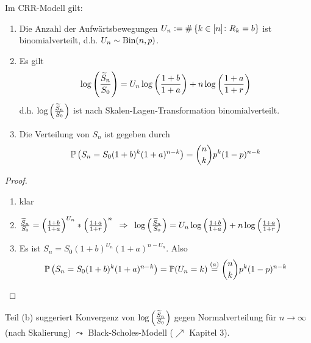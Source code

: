 \begin{proposition} %
	Im CRR-Modell gilt:
	\begin{enumerate}[label=(\alph*)]
		\item Die Anzahl der Aufwärtsbewegungen $U_n \mathrel{:=} \# \left\{ k \in [n] \colon R_k = b \right\}$ ist binomialverteilt, d.h. $U_n \sim \operatorname{Bin}(n,p)$.
		\item Es gilt 
		\begin{equation*}
			\log\left( \frac{\widetilde{S}_n}{S_0} \right) = U_n \log\left( \frac{1+b}{1+a} \right) + n \log\left( \frac{1+a}{1+r} \right)
		\end{equation*}
		d.h. $\log\left( \frac{\widetilde{S}_n}{S_0} \right)$ ist nach Skalen-Lagen-Transformation binomialverteilt.
		\item Die Verteilung von $S_n$ ist gegeben durch
		\begin{equation*}
			\mathbb{P}\left( S_n = S_0 (1+b)^k (1+a)^{n-k} \right) = \binom{n}{k} p^k (1-p)^{n-k}
		\end{equation*} 
	\end{enumerate}
\end{proposition}

\begin{proof}
	\begin{enumerate}[label=(zu \alph*), leftmargin=\zulength]
		\item klar
		\item $\frac{\widetilde{S}_n}{S_0} = \left( \frac{1+b}{1+a} \right)^{U_n} * \left( \frac{1+a}{1+r} \right)^n \enskip \Rightarrow \enskip \log\left( \frac{\widetilde{S}_n}{S_0} \right) = U_n \log\left( \frac{1+b}{1+a} \right) + n \log\left( \frac{1+a}{1+r} \right)$
		\item Es ist $S_n = S_0 (1+b)^{U_n}(1+a)^{n-U_n} $. Also
		\begin{equation*}
			\mathbb{P}\left( S_n = S_0 (1+b)^k (1+a)^{n-k} \right) = \mathbb{P}(U_n = k) \overset{(a)}{=} \binom{n}{k} p^k (1-p)^{n-k}
		\end{equation*}
	\end{enumerate}
\end{proof}

\begin{*bemerkung_inline}
	Teil (b) suggeriert Konvergenz von $\log\left( \frac{\widetilde{S}_n}{S_0} \right)$ gegen Normalverteilung für $n \to \infty$ (nach Skalierung) 
	$\leadsto$ Black-Scholes-Modell ($\nearrow$ Kapitel 3).
\end{*bemerkung_inline}
